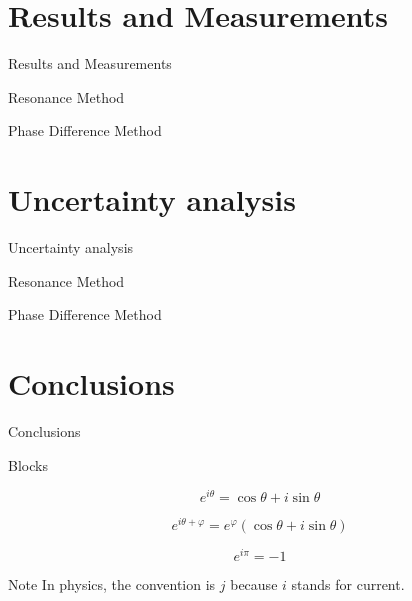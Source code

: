 \documentclass{beamer}
\begin{document}
\section{Results and Measurements}
\begin{frame}{Results and Measurements}
\end{frame}
\begin{frame}{Resonance Method}
\end{frame}
\begin{frame}{Phase Difference Method}
\end{frame}

\section{Uncertainty analysis}
\begin{frame}{Uncertainty analysis}
\end{frame}
\begin{frame}{Resonance Method}
\end{frame}
\begin{frame}{Phase Difference Method}
\end{frame}

\section{Conclusions}
\begin{frame}{Conclusions}
\end{frame}

\begin{frame}{Blocks}
    \begin{theorem}
        \[
            e^{i \theta} = \cos \theta + i \sin \theta
        \]
    \end{theorem}

    \begin{corollary}
        \[
            e^{i \theta + \varphi} = e^\varphi (\cos \theta + i \sin \theta)
        \]
    \end{corollary}

    \begin{example}
        \[
            e^{i \pi} = -1
        \]
    \end{example}

    \begin{block}{Note}
        In physics, the convention is $j$ because $i$ stands for current.
    \end{block}
\end{frame}
\end{document}

